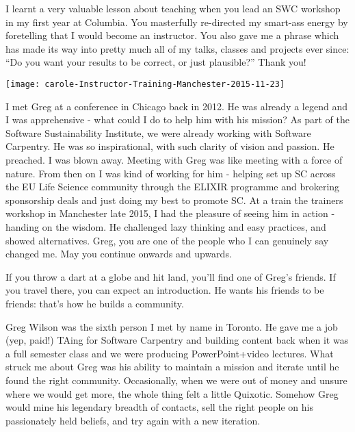 
\newpage

I learnt a very valuable lesson about teaching when you lead an SWC workshop in
my first year at Columbia.  You masterfully re-directed my smart-ass energy by
foretelling that I would become an instructor. You also gave me a phrase which
has made its way into pretty much all of my talks, classes and projects ever
since: ``Do you want your results to be correct, or just plausible?'' Thank
you!


\newpage
\texttt{[image: carole-Instructor-Training-Manchester-2015-11-23]}

I met Greg at  a conference in Chicago back in 2012. He was already a legend
and I was apprehensive - what could I do to help him with his mission? As part
of the Software Sustainability Institute, we were already working with Software
Carpentry. He was so inspirational, with such clarity of vision and passion. He
preached. I was blown away.  Meeting with Greg was like meeting with a force of
nature. From then on I was kind of working for him - helping set up SC across
the EU Life Science community through the ELIXIR programme and brokering
sponsorship deals and just doing my best  to promote SC. At a train the
trainers workshop in Manchester late 2015, I had the pleasure of seeing him in
action - handing on the wisdom. He challenged lazy thinking and easy practices,
and showed alternatives. Greg, you are one of the people who I can genuinely
say changed me. May you continue onwards and upwards.


\newpage

If you throw a dart at a globe and hit land, you'll find one of Greg's friends.
If you travel there, you can expect an introduction. He wants his friends to be
friends: that's how he builds a community.

Greg Wilson was the sixth person I met by name in Toronto. He gave me a job
(yep, paid!) TAing for Software Carpentry and building content back when it was
a full semester class and we were producing PowerPoint+video lectures. What
struck me about Greg was his ability to maintain a mission and iterate until he
found the right community. Occasionally, when we were out of money and unsure
where we would get more, the whole thing felt a little Quixotic. Somehow Greg
would mine his legendary breadth of contacts, sell the right people on his
passionately held beliefs, and try again with a new iteration. 

